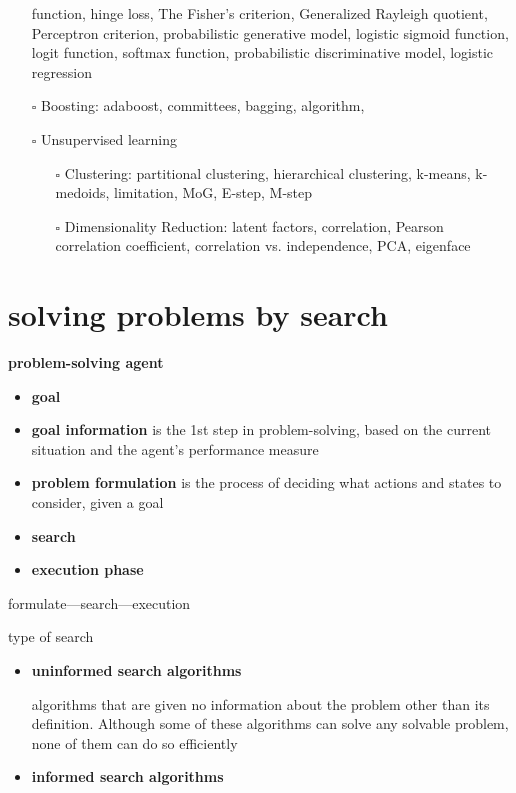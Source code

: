 \documentclass[11pt]{article}
\begin{document}
\begin{itemize}
function, hinge loss, The Fisher’s criterion, Generalized Rayleigh
quotient, Perceptron criterion, probabilistic generative model, logistic
sigmoid function, logit function, softmax function, probabilistic
discriminative model, logistic regression
\item[{$\square$}] Boosting: adaboost, committees, bagging, algorithm,
\item[{$\square$}] Unsupervised learning
\begin{itemize}
\item[{$\square$}] Clustering: partitional clustering, hierarchical clustering, k-means,
k-medoids, limitation, MoG, E-step, M-step
\item[{$\square$}] Dimensionality Reduction: latent factors, correlation, Pearson
correlation coefficient, correlation vs. independence, PCA, eigenface
\end{itemize}
\end{itemize}
\section{solving problems by search}
\label{sec:org495db00}
\textbf{problem-solving agent}
\begin{itemize}
\item \textbf{goal}
\item \textbf{goal information} is the 1st step in problem-solving, based on the
current situation and the agent’s performance measure
\item \textbf{problem formulation} is the process of deciding what actions and
states to consider, given a goal
\item \textbf{search}
\item \textbf{execution phase}
\end{itemize}


formulate—search—execution


type of search
\begin{itemize}
\item \textbf{uninformed search algorithms}

algorithms that are given no information about the problem other
than its definition. Although some of these algorithms can solve
any solvable problem, none of them can do so efficiently
\item \textbf{informed search algorithms}
\end{itemize}
\end{document}
